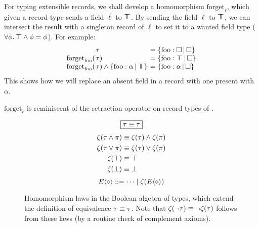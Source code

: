 \begin{example}
    For typing extensible records, we shall develop a homomorphism $\mathrm{forget}_\ell$, which given a record type sends a field $\ell$ to $\top \!\!\!\! \top$.
    By sending the field $\ell$ to $\top \!\!\!\! \top$, we can intersect the result with a singleton record of $\ell$ to set it to a wanted field type ($\forall \phi \ldotp \top \!\!\!\! \top \land \phi = \phi$). 
    For example:
    \setlength{\tabcolsep}{0pt}
    $$\begin{array}{rll}
        &\hspace{-0.9em}\tau &\;\hspace{-0.9em}= \flext{\mathrm{foo}: \flabsent}{\flabsent} \\
        \mathrm{forget}_\mathrm{foo}( &\hspace{-0.9em}\tau ) &\;\hspace{-0.9em}= \flext{\mathrm{foo}: \flftop}{\flabsent} \\
        \mathrm{forget}_\mathrm{foo}( &\hspace{-0.9em}\tau ) \meet \flext{\mathrm{foo}: \alpha}{\flftop} &\;\hspace{-0.9em}= \flext{\mathrm{foo}: \alpha}{\flabsent}
    \end{array}$$
    This shows how we will replace an absent field in a record with one present with $\alpha$.

    $\mathrm{forget}_\ell$ is reminiscent of the retraction operator on record types of \textcite{operations-on-records}.
\end{example}

\begin{figure}
    \centering
    $$\boxed{\tau \equiv \tau}$$
    \vspace{-2em}
    \begin{align*}
        \zeta(\tau \land \pi) &\equiv \zeta(\tau) \land \zeta(\pi) \\
        \zeta(\tau \lor \pi) &\equiv \zeta(\tau) \lor \zeta(\pi) \\
        \zeta(\top) &\equiv \top \\
        \zeta(\bot) &\equiv \bot
    \end{align*}
    \vspace{-1em}
    $$ \equivctx ::= \cdots \mid \morph(\equivctx) $$
    \caption{Homomorphism laws in the Boolean algebra of types, which extend the definition of equivalence $\tau \equiv \tau$. Note that $\zeta(\lnot \tau) \equiv \lnot \zeta(\tau)$ follows from these laws (by a routine check of complement axioms).}
    \label{fig:morphism-laws}
\end{figure}

